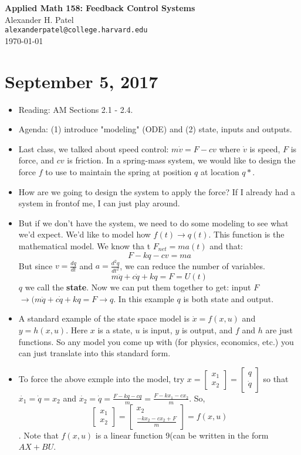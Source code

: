 \documentclass[12pt]{article}
\theoremstyle{definition}
\begin{document}
\begin{center}
\textbf{Applied Math 158: Feedback Control Systems} \\
Alexander H. Patel \\
{\tt alexanderpatel@college.harvard.edu} \\
\today
\end{center}

\tableofcontents

\section{September 5, 2017}
\begin{itemize}
    \itemsep0em 
    \item Reading: AM Sections 2.1 - 2.4.
    \item Agenda: (1) introduce "modeling" (ODE) and (2) state, inputs and outputs. 
    \item Last class, we talked about speed control: $m\dot{v} = F - cv$ where $\dot{v}$ is speed, $F$ is force, and $cv$ is friction. In a spring-mass system, we would like to design the force $f$ to use to maintain the spring at position $q$ at location $q*$. 
    \item How are we going to design the system to apply the force? If I already had a system in frontof me, I can just play around.
    \item But if we don't have the system, we need to do some modeling to see what we'd expect. We'd like to model how $f(t) \rightarrow q(t)$. This function is the mathematical model. We know tha t $F_{net} = ma(t)$ and that:
    $$F - kq - cv = ma$$
    But since $v = \frac{dq}{dt}$ and $a = \frac{d^2q}{dt^2}$, we can reduce the number of variables.
    $$m\ddot{q} + c\dot{q} + kq = F = U(t)$$
    $q$ we call the \textbf{state}. Now we can put them together to get: input $F$ $\rightarrow (m\ddot{q} + c\dot{q} + kq = F \rightarrow q$. In this example $q$ is both state and output.
    \item A standard example of the state space model is $\dot{x} = f(x, u)$ and $y = h(x, u)$. Here $x$ is a state, $u$ is input, $y$ is output, and $f$ and $h$ are just functions. So any model you come up with (for physics, economics, etc.) you can just translate into this standard form.
    \item To force the above exmple into the model, try $x = \begin{bmatrix}x_1 \\ x_2 \end{bmatrix} = \begin{bmatrix} q \\ \dot{q} \end{bmatrix}$ so that $\dot{x_1} = \dot{q} = x_2$ and $\dot{x_2} = \dot{q} = \frac{F - kq - cq}{m} = \frac{F - kx_1 - cx_2}{m}$. So, $$\begin{bmatrix} x_1 \\ x_2 \end{bmatrix} = \begin{bmatrix} x_2 \\ \frac{-kx_2 - cx_2 + F}{m} \end{bmatrix} = f(x, u)$$. Note that $f(x, u)$ is a linear function 9(can be written in the form $AX + BU$.

\end{itemize}
\end{document}
